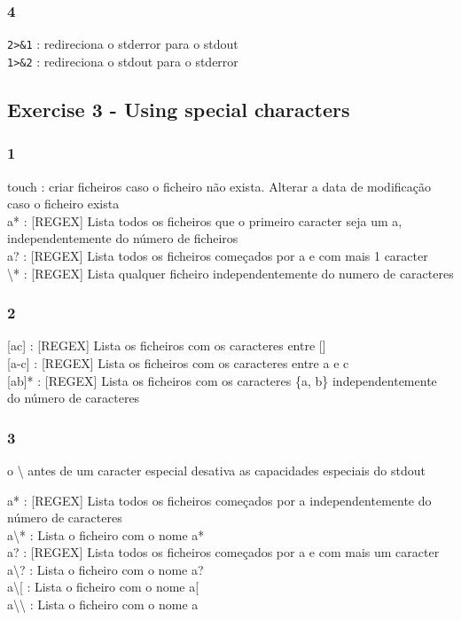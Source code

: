 \documentclass[]{article}
\begin{document}
\subsubsection{4}\label{section-3}

\texttt{2\textgreater{}\&1} : redireciona o stderror para o
stdout\\\texttt{1\textgreater{}\&2} : redireciona o stdout para o
stderror

\subsection{Exercise 3 - Using special
characters}\label{exercise-3---using-special-characters}

\subsubsection{1}\label{section-4}

touch : criar ficheiros caso o ficheiro não exista. Alterar a data de
modificação caso o ficheiro exista\\a* : {[}REGEX{]} Lista todos os
ficheiros que o primeiro caracter seja um a, independentemente do número
de ficheiros\\a? : {[}REGEX{]} Lista todos os ficheiros começados por a
e com mais 1 caracter\\\textbackslash{}* : {[}REGEX{]} Lista qualquer
ficheiro independentemente do numero de caracteres

\subsubsection{2}\label{section-5}

{[}ac{]} : {[}REGEX{]} Lista os ficheiros com os caracteres entre
{[}{]}\\{[}a-c{]} : {[}REGEX{]} Lista os ficheiros com os caracteres
entre a e c\\{[}ab{]}* : {[}REGEX{]} Lista os ficheiros com os
caracteres \{a, b\} independentemente do número de caracteres

\subsubsection{3}\label{section-6}

o \textbackslash{} antes de um caracter especial desativa as capacidades
especiais do stdout

a* : {[}REGEX{]} Lista todos os ficheiros começados por a
independentemente do número de caracteres\\a\textbackslash{}* : Lista o
ficheiro com o nome a*\\a? : {[}REGEX{]} Lista todos os ficheiros
começados por a e com mais um caracter\\a\textbackslash{}? : Lista o
ficheiro com o nome a?\\a\textbackslash{}{[} : Lista o ficheiro com o
nome a{[}\\a\textbackslash{}\textbackslash{} : Lista o ficheiro com o
nome a~
\end{document}
